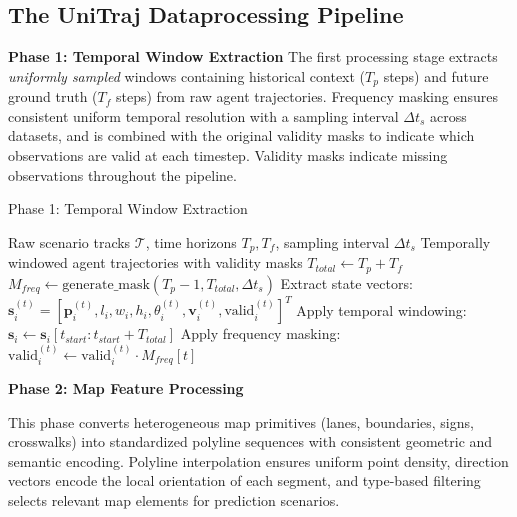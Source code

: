 \subsection{The UniTraj Dataprocessing Pipeline}
\label{app:framework}

\textbf{Phase 1: Temporal Window Extraction}
The first processing stage extracts \emph{uniformly sampled} windows containing historical context (\(T_p\) steps) and future ground truth (\(T_f\) steps) from raw agent trajectories. Frequency masking ensures consistent uniform temporal resolution with a sampling interval \(\Delta t_{s}\) across datasets, and is combined with the original validity masks to indicate which observations are valid at each timestep. Validity masks indicate missing observations throughout the pipeline.

\begin{algorithm}[H]
\caption{Phase 1: Temporal Window Extraction}
\label{alg:phase1_temporal}
\begin{algorithmic}[1]
\REQUIRE Raw scenario tracks \(\mathcal{T}\), time horizons \(T_p, T_f\), sampling interval \(\Delta t_{s}\)
\ENSURE Temporally windowed agent trajectories with validity masks
\STATE \(T_{total} \leftarrow T_p + T_f\) 
\STATE \(M_{freq} \leftarrow \text{generate\_mask}(T_p - 1, T_{total}, \Delta t_{s})\) 
    \STATE Extract state vectors: \(\boldsymbol{s}_i^{(t)} = [\boldsymbol{p}_i^{(t)}, l_i, w_i, h_i, \theta_i^{(t)}, \boldsymbol{v}_i^{(t)}, \text{valid}_i^{(t)}]^T\)
    \STATE Apply temporal windowing: \(\boldsymbol{s}_i \leftarrow \boldsymbol{s}_i[t_{start} : t_{start} + T_{total}]\)
    \STATE Apply frequency masking: \(\text{valid}_i^{(t)} \leftarrow \text{valid}_i^{(t)} \cdot M_{freq}[t]\)
\ENDFOR
\end{algorithmic}
\end{algorithm}

\textbf{Phase 2: Map Feature Processing}

This phase converts heterogeneous map primitives (lanes, boundaries, signs, crosswalks) into standardized polyline sequences with consistent geometric and semantic encoding. Polyline interpolation ensures uniform point density, direction vectors encode the local orientation of each segment, and type-based filtering selects relevant map elements for prediction scenarios.

